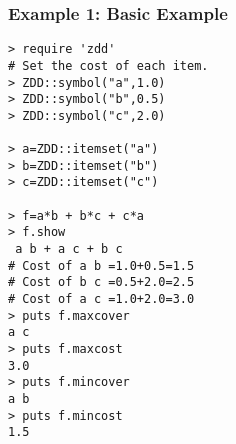 \subsubsection*{Example 1: Basic Example}



\begin{Verbatim}[baselinestretch=0.7,frame=single]
> require 'zdd'
# Set the cost of each item. 
> ZDD::symbol("a",1.0)
> ZDD::symbol("b",0.5)
> ZDD::symbol("c",2.0)

> a=ZDD::itemset("a")
> b=ZDD::itemset("b")
> c=ZDD::itemset("c")

> f=a*b + b*c + c*a
> f.show
 a b + a c + b c
# Cost of a b =1.0+0.5=1.5
# Cost of b c =0.5+2.0=2.5
# Cost of a c =1.0+2.0=3.0
> puts f.maxcover
a c
> puts f.maxcost
3.0
> puts f.mincover
a b
> puts f.mincost
1.5
\end{Verbatim}
